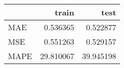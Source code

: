\begin{tabular}{lrr}
\toprule
{} &      train &       test \\
\midrule
MAE  &   0.536365 &   0.522877 \\
MSE  &   0.551263 &   0.529157 \\
MAPE &  29.810067 &  39.945198 \\
\bottomrule
\end{tabular}
